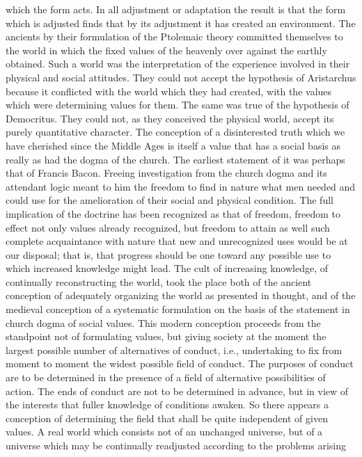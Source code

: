 \documentclass[12pt]{article}
\begin{document}
which the form acts. In all adjustment or adaptation
the result is that the form which is adjusted finds that
by its adjustment it has created an environment. The
ancients by their formulation of the Ptolemaic theory
committed themselves to the world in which the fixed
values of the heavenly over against the earthly obtained.
Such a world was the interpretation of the experience
involved in their physical and social attitudes. They
could not accept the hypothesis of Aristarchus because
it conflicted with the world which they had created, with
the values which were determining values for them. The
same was true of the hypothesis of Democritus. They
could not, as they conceived the physical world, accept
its purely quantitative character. The conception of a
disinterested truth which we have cherished since the
Middle Ages is itself a value that has a social basis as
really as had the dogma of the church. The earliest
statement of it was perhaps that of Francis Bacon.
Freeing investigation from the church dogma and its
attendant logic meant to him the freedom to find in
nature what men needed and could use for the amelioration
of their social and physical condition. The full
implication of the doctrine has been recognized as that
of freedom, freedom to effect not only values already
recognized, but freedom to attain as well such complete
acquaintance with nature that new and unrecognized
uses would be at our disposal; that is, that progress
should be one toward any possible use to which increased
knowledge might lead. The cult of increasing
knowledge, of continually reconstructing the world, took
the place both of the ancient conception of adequately
organizing the world as presented in thought,
and of the medieval conception of a systematic formulation
on the basis of the statement in church dogma of social
values. This modern conception proceeds from the
standpoint not of formulating values, but giving society
at the moment the largest possible number of alternatives
of conduct, i.e., undertaking to fix from moment
to moment the widest possible field of conduct. The purposes
of conduct are to be determined in the presence
of a field of alternative possibilities of action. The ends
of conduct are not to be determined in advance, but in
view of the interests that fuller knowledge of conditions
awaken. So there appears a conception of determining
the field that shall be quite independent of given
values. A real world which consists not of an unchanged
universe, but of a universe which may be continually
readjusted according to the problems arising
\end{document}
